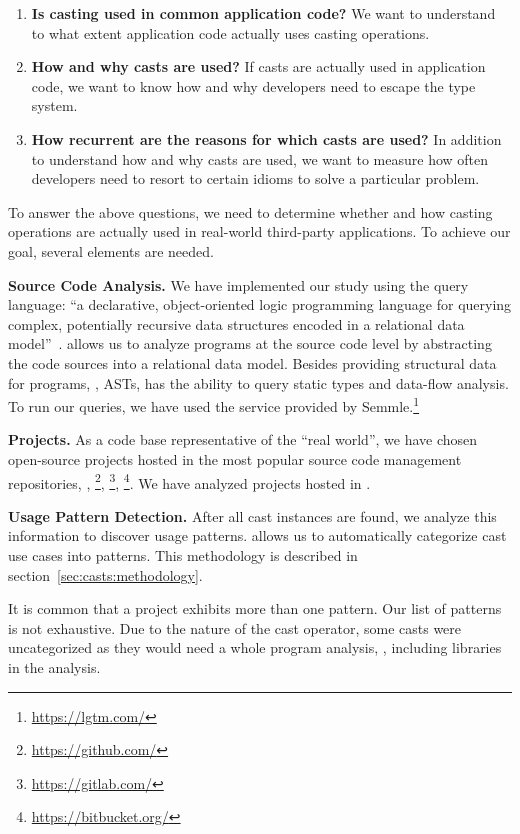 \begin{enumerate}[label=$CRQ\arabic*:$,ref=$CRQ\arabic*$,leftmargin=3.4\parindent]
\item\label{enum:rq1}{\bf Is casting used in common application code?}
We want to understand to what extent application code actually uses casting operations.
\item\label{enum:rq2}{\bf How and why casts are used?}
If casts are actually used in application code, we want to know how and why developers need to escape the type system.
\item\label{enum:rq3}{\bf How recurrent are the reasons for which casts are used?}
In addition to understand how and why casts are used, we want to measure how often developers need to resort to certain idioms to solve a particular problem.
\end{enumerate}

To answer the above questions, we need to determine whether and how casting operations are actually used in real-world third-party \java{} applications.
To achieve our goal, several elements are needed.

\textbf{Source Code Analysis.}
We have implemented our study using the \ql{} query language:
``a declarative, object-oriented logic programming language for querying complex, potentially recursive data structures encoded in a relational data model''~\cite{avgustinovQLObjectorientedQueries2016}.
\ql{} allows us to analyze programs at the source code level by abstracting the code sources into a relational data model.
Besides providing structural data for programs, \ie{}, ASTs, \ql{} has the ability to query static types and data-flow analysis.
To run our \ql{} queries, we have used the service provided by Semmle.\footnote{\url{https://lgtm.com/}} 

\textbf{Projects.} 
As a code base representative of the ``real world'',
we have chosen open-source projects hosted in the most popular source code management repositories, \ie{},
\github{}\footnote{\url{https://github.com/}},
\gitlab{}\footnote{\url{https://gitlab.com/}},
\bitbucket{}\footnote{\url{https://bitbucket.org/}}.
We have analyzed \nproject{} \java{} projects hosted in \lgtm{}.

\textbf{Usage Pattern Detection.}
After all cast instances are found, we analyze this information to discover usage patterns.
\ql{} allows us to automatically categorize cast use cases into patterns.
This methodology is described in section~\ref{sec:casts:methodology}.

It is common that a project exhibits more than one pattern.
Our list of patterns is not exhaustive.
Due to the nature of the cast operator, some casts were uncategorized as they would need a whole program analysis, \eg{}, including libraries in the analysis.


